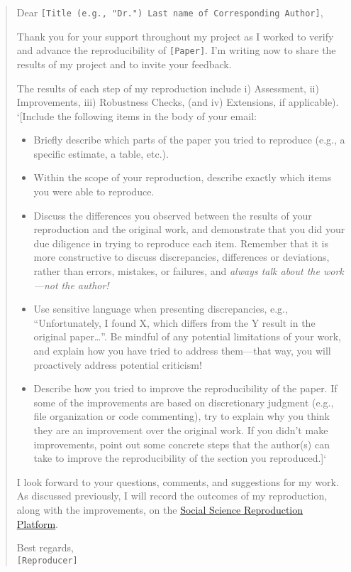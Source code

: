 \begin{quote}
Dear
\texttt{{[}Title\ (e.g.,\ "Dr.")\ Last\ name\ of\ Corresponding\ Author{]}},

Thank you for your support throughout my project as I worked to verify
and advance the reproducibility of \texttt{{[}Paper{]}}. I'm writing now
to share the results of my project and to invite your feedback.

The results of each step of my reproduction include i) Assessment, ii)
Improvements, iii) Robustness Checks, (and iv) Extensions, if
applicable).\\
`{[}Include the following items in the body of your email:

\begin{itemize}
\tightlist
\item
  Briefly describe which parts of the paper you tried to reproduce
  (e.g., a specific estimate, a table, etc.).\\
\item
  Within the scope of your reproduction, describe exactly which items
  you were able to reproduce.\\
\item
  Discuss the differences you observed between the results of your
  reproduction and the original work, and demonstrate that you did your
  due diligence in trying to reproduce each item. Remember that it is
  more constructive to discuss discrepancies, differences or deviations,
  rather than errors, mistakes, or failures, and \textit{always talk about
  the work---not the author!}\\
\item
  Use sensitive language when presenting discrepancies, e.g.,
  ``Unfortunately, I found X, which differs from the Y result in the
  original paper\ldots{}''. Be mindful of any potential limitations of
  your work, and explain how you have tried to address them---that way,
  you will proactively address potential criticism!\\
\item
  Describe how you tried to improve the reproducibility of the paper. If
  some of the improvements are based on discretionary judgment (e.g.,
  file organization or code commenting), try to explain why you think
  they are an improvement over the original work. If you didn't make
  improvements, point out some concrete steps that the author(s) can
  take to improve the reproducibility of the section you reproduced.{]}`
\end{itemize}

I look forward to your questions, comments, and suggestions for my work.
As discussed previously, I will record the outcomes of my reproduction,
along with the improvements, on the
\href{https://www.socialsciencereproduction.org/}{Social Science
Reproduction Platform}.

Best regards,\\
\texttt{{[}Reproducer{]}}
\end{quote}

